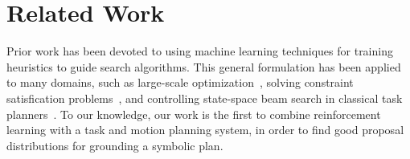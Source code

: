 \section{Related Work}
Prior work has been devoted to using machine learning techniques for
training heuristics to guide search algorithms. This general formulation
has been applied to many domains, such as large-scale optimization~\cite{Boyanlearning},
solving constraint satisfication problems~\cite{hamadisearch}, and controlling state-space beam
search in classical task planners~\cite{Xu07discriminativelearning}. To our knowledge, our work is the
first to combine reinforcement learning with a task and motion planning
system, in order to find good proposal distributions for grounding a symbolic
plan.
